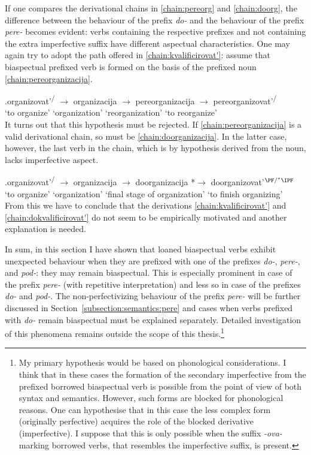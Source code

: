 If one compares the derivational chains in \ref{chain:pereorg} and \ref{chain:doorg}, the difference between the behaviour of the prefix \textit{do-} and the behaviour of the prefix \textit{pere-} becomes evident: verbs containing the respective prefixes and not containing the extra imperfective suffix have different aspectual characteristics. One may again try to adopt the path offered in \ref{chain:kvalificirovat'}: assume that biaspectual prefixed verb is formed on the basis of the prefixed noun \ref{chain:pereorganizacija}.
 
\exg.\label{chain:pereorganizacija}organizovat'\textsuperscript{\PF\slash\IPF} {$\rightarrow$} organizacija {$\rightarrow$} pereorganizacija {$\rightarrow$} {pereorganizovat'\textsuperscript{\PF\slash\IPF}}\\
{`to organize'} {} `organization' {} `reorganization' {} {`to reorganize'}\\

It turns out that this hypothesis must be rejected. If \ref{chain:pereorganizacija} is a valid derivational chain, so must be \ref{chain:doorganizacija}. In the latter case, however, the last verb in the chain, which is by hypothesis derived from the noun, lacks imperfective aspect. 

\exg.\label{chain:doorganizacija}organizovat'\textsuperscript{\PF\slash\IPF} {$\rightarrow$} organizacija {$\rightarrow$} doorganizacija {*$\rightarrow$} {doorganizovat'$^{{\PF}/^*{\IPF}}$}\\
{`to organize'} {} `organization' {} {`final stage of organization'} {} {`to finish organizing'}\\

From this we have to conclude that the derivations \ref{chain:kvalificirovat'} and \ref{chain:dokvalificirovat'} do not seem to be empirically motivated and another explanation is needed. 

In sum, in this section I have shown that loaned biaspectual verbs exhibit unexpected behaviour when they are prefixed with one of the prefixes \textit{do-}, \textit{pere-}, and \textit{pod-}: they may remain biaspectual. This is especially prominent in case of the prefix \textit{pere-} (with repetitive interpretation) and less so in case of the prefixes \textit{do-} and \textit{pod-}. The non-perfectivizing behaviour of the prefix \textit{pere-} will be further discussed in Section~\ref{subsection:semantics:pere} and cases when verbs prefixed with \textit{do-} remain biaspectual must be explained separately. Detailed investigation of this phenomena remains outside the scope of this thesis.\footnote{My primary hypothesis would be based on phonological considerations. I think that in these cases the formation of the secondary imperfective from the prefixed borrowed biaspectual verb is possible from the point of view of both syntax and semantics. However, such forms are blocked for phonological reasons. One can hypothesise that in this case the less complex form (originally perfective) acquires the role of the blocked derivative (imperfective). I suppose that this is only possible when the suffix \textit{-ova-} marking borrowed verbs, that resembles the imperfective suffix, is present.}
	
